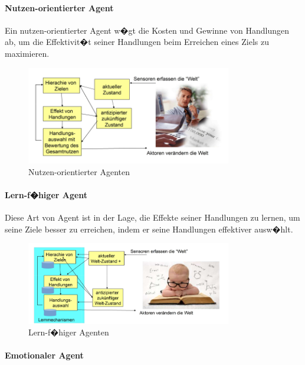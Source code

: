 \newpage
\paragraph{Nutzen-orientierter Agent}

Ein nutzen-orientierter Agent w�gt die Kosten und Gewinne von Handlungen ab, um die Effektivit�t seiner Handlungen beim Erreichen eines Ziels zu maximieren.

\begin{figure}[H]
    \centering
    \includegraphics[width=0.8\textwidth]{figures/nutzen-orientierter-agent.png}
    \caption{Nutzen-orientierter Agenten}
    \label{fig:nutzen-orientierter-agent}
\end{figure}

\paragraph{Lern-f�higer Agent}

Diese Art von Agent ist in der Lage, die Effekte seiner Handlungen zu lernen, um seine Ziele besser zu erreichen, indem er seine Handlungen effektiver ausw�hlt.

\begin{figure}[H]
    \centering
    \includegraphics[width=0.8\textwidth]{figures/lern-agent.png}
    \caption{Lern-f�higer Agenten}
    \label{fig:lernen-agent}
\end{figure}

\paragraph{Emotionaler Agent}

